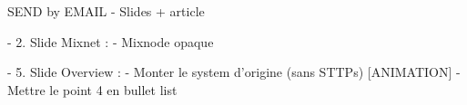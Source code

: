 SEND by EMAIL - Slides + article

- 2. Slide Mixnet :
    - Mixnode opaque

- 5. Slide Overview : 
    - Monter le system d'origine (sans STTPs) [ANIMATION]
    - Mettre le point 4 en bullet list
